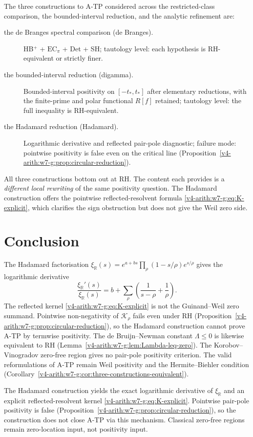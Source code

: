 \begin{remark}
\label{v4-arith:w7-g:rem:tautology-map}
The three constructions to A-TP considered across the restricted-class comparison, the bounded-interval reduction, and
the analytic refinement are:
\begin{description}
\item[the de Branges spectral comparison (de Branges).] HB\(^{+}\) + \(\mathrm{EC}_\pi\) + Det + SH;
tautology level: each hypothesis is RH-equivalent or strictly finer.
\item[the bounded-interval reduction (digamma).] Bounded-interval positivity on
\([-t_{\ast},t_{\ast}]\) after elementary reductions, with the
finite-prime and polar functional \(R[f]\) retained; tautology level:
the full inequality is RH-equivalent.
\item[the Hadamard reduction (Hadamard).] Logarithmic derivative and reflected pair-pole diagnostic;
failure mode: pointwise positivity is false even on the critical line
(Proposition~\ref{v4-arith:w7-g:prop:circular-reduction}).
\end{description}
All three constructions bottom out at RH. The content each provides is a
\emph{different local rewriting} of the same positivity question. The
Hadamard construction offers the pointwise reflected-resolvent formula
\eqref{v4-arith:w7-g:eq:K-explicit}, which clarifies the sign
obstruction but does not give the Weil zero side.
\end{remark}

\section{Conclusion}
\label{v4-arith:w7-g:conclusion}

The Hadamard factorisation
\(\xi_{\mathbb{R}}(s)=e^{a+bs}\prod_{\rho}(1-s/\rho)e^{s/\rho}\)
gives the logarithmic derivative
\[
\frac{\xi_{\mathbb R}'(s)}{\xi_{\mathbb R}(s)}
=b+\sum_{\rho}\left(\frac{1}{s-\rho}+\frac{1}{\rho}\right).
\]
The reflected kernel \eqref{v4-arith:w7-g:eq:K-explicit} is not the
Guinand--Weil zero summand. Pointwise non-negativity of
\(\mathcal{K}_{\rho}\) fails even under RH
(Proposition~\ref{v4-arith:w7-g:prop:circular-reduction}), so the
Hadamard construction cannot prove A-TP by termwise positivity. The
de Bruijn--Newman constant \(\Lambda\leq 0\) is likewise equivalent to
RH (Lemma~\ref{v4-arith:w7-g:lem:Lambda-leq-zero}). The
Korobov--Vinogradov zero-free region gives no pair-pole positivity
criterion. The valid reformulations of A-TP remain Weil positivity
and the Hermite--Biehler condition
(Corollary~\ref{v4-arith:w7-g:cor:three-constructions-equivalent}).

\begin{remark}
\label{v4-arith:w7-g:rem:consequence}
The Hadamard construction yields the exact logarithmic derivative of
\(\xi_{\mathbb R}\) and an explicit reflected-resolvent kernel
\eqref{v4-arith:w7-g:eq:K-explicit}. Pointwise pair-pole positivity is false
(Proposition~\ref{v4-arith:w7-g:prop:circular-reduction}), so the
construction does not close A-TP via this mechanism. Classical zero-free
regions remain zero-location input, not positivity input.
\end{remark}
